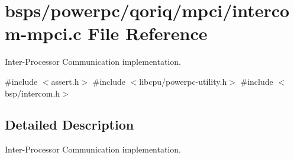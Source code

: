 \hypertarget{intercom-mpci_8c}{}\section{bsps/powerpc/qoriq/mpci/intercom-\/mpci.c File Reference}
\label{intercom-mpci_8c}


Inter-\/\+Processor Communication implementation.  


{\ttfamily \#include $<$assert.\+h$>$}\newline
{\ttfamily \#include $<$libcpu/powerpc-\/utility.\+h$>$}\newline
{\ttfamily \#include $<$bsp/intercom.\+h$>$}\newline


\subsection{Detailed Description}
Inter-\/\+Processor Communication implementation. 

